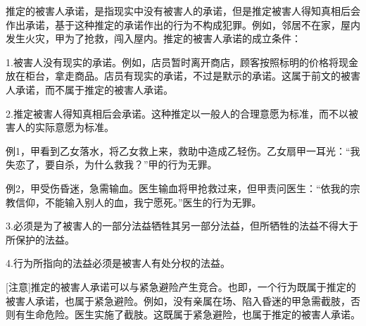 推定的被害人承诺，是指现实中没有被害人的承诺，但是推定被害人得知真相后会作出承诺，基于这种推定的承诺作出的行为不构成犯罪。例如，邻居不在家，屋内发生火灾，甲为了抢救，闯入屋内。推定的被害人承诺的成立条件：

1.被害人没有现实的承诺。例如，店员暂时离开商店，顾客按照标明的价格将现金放在柜台，拿走商品。店员有现实的承诺，不过是默示的承诺。这属于前文的被害人承诺，而不属于推定的被害人承诺。

2.推定被害人得知真相后会承诺。这种推定以一般人的合理意愿为标准，而不以被害人的实际意愿为标准。

例1，甲看到乙女落水，将乙女救上来，救助中造成乙轻伤。乙女扇甲一耳光：“我失恋了，要自杀，为什么救我？”甲的行为无罪。

例2，甲受伤昏迷，急需输血。医生输血将甲抢救过来，但甲责问医生：“依我的宗教信仰，不能输入别人的血，我宁愿死。”医生的行为无罪。

3.必须是为了被害人的一部分法益牺牲其另一部分法益，但所牺牲的法益不得大于所保护的法益。

4.行为所指向的法益必须是被害人有处分权的法益。

[注意]推定的被害人承诺可以与紧急避险产生竞合。也即，一个行为既属于推定的被害人承诺，也属于紧急避险。例如，没有亲属在场、陷入昏迷的甲急需截肢，否则有生命危险。医生实施了截肢。这既属于紧急避险，也属于推定的被害人承诺。
